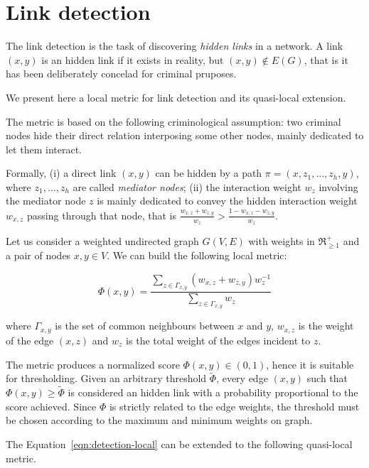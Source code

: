 \section{Link detection}
\label{sec:link-detection}

The link detection is the task of discovering \textit{hidden links} in a network. A link $(x,y)$ is an hidden link if it exists in reality, but $(x,y)\notin E(G)$, that is it has been deliberately concelad for criminal pruposes.

We present here a local metric for link detection and its quasi-local extension.

The metric is based on the following criminological assumption: 
two criminal nodes hide their direct relation interposing some other nodes, mainly dedicated to let them interact.

Formally, 
(i) a direct link $(x,y)$ can be hidden by a path $\pi=(x,z_{1},\ldots,z_{h},y)$, where $z_{1},\ldots,z_{h}$ are called \textit{mediator nodes};
(ii) the interaction weight $w_{z}$ involving the mediator node $z$ is mainly dedicated to convey the hidden interaction weight $w_{x,z}$ passing through that node, that is $\frac{w_{x,z}+w_{z,y}}{w_{z}} > \frac{1-w_{x,z}-w_{z,y}}{w_{z}}$.

Let us consider a weighted undirected graph $G(V,E)$ with weights in $\Re_{\geq1}^{+}$ and a pair of nodes $x,y\in V$.
We can build the following local metric:


\begin{equation}
\label{eqn:detection-local}
\Phi(x,y)=
\frac{\sum\limits_{z\in\Gamma_{x,y}}(w_{x,z}+w_{z,y})w_{z}^{-1}}
{\sum\limits_{z\in\Gamma_{x,y}}w_{z}}
\end{equation}

where 
$\Gamma_{x,y}$ is the set of common neighbours between $x$ and $y$,
$w_{x,z}$ is the weight of the edge $(x,z)$ and
$w_{z}$ is the total weight of the edges incident to $z$.

The metric produces a normalized score $\Phi(x,y)\in(0,1)$, hence it is suitable for thresholding.
Given an arbitrary threshold $\tilde{\Phi}$, every edge $(x,y)$ such that $\Phi(x,y)\geq\tilde{\Phi}$ is considered an hidden link with a probability proportional to the score achieved.
Since $\Phi$ is strictly related to the edge weights, the threshold must be chosen according to the maximum and minimum weights on graph.

The Equation~\ref{eqn:detection-local} can be extended to the following quasi-local metric.

